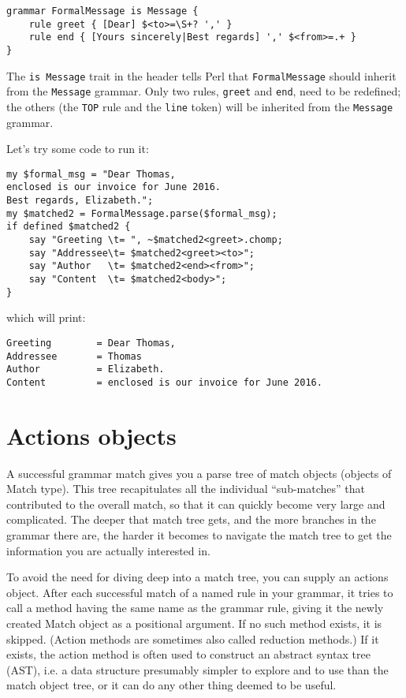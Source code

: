 \begin{verbatim}
grammar FormalMessage is Message {
    rule greet { [Dear] $<to>=\S+? ',' }
    rule end { [Yours sincerely|Best regards] ',' $<from>=.+ }
}
\end{verbatim}

The {\tt is Message} trait in the header tells Perl that 
{\tt FormalMessage} should inherit from the {\tt Message} grammar. 
Only two rules, {\tt greet} and {\tt end}, need to be 
redefined; the others (the {\tt TOP} rule 
and the {\tt line} token) will be inherited from the 
{\tt Message} grammar.

Let's try some code to run it:

\begin{verbatim}
my $formal_msg = "Dear Thomas,
enclosed is our invoice for June 2016.
Best regards, Elizabeth.";
my $matched2 = FormalMessage.parse($formal_msg);
if defined $matched2 { 
    say "Greeting \t= ", ~$matched2<greet>.chomp;
    say "Addressee\t= $matched2<greet><to>";
    say "Author   \t= $matched2<end><from>";
    say "Content  \t= $matched2<body>";
}
\end{verbatim}

which will print:

\begin{verbatim}
Greeting        = Dear Thomas,
Addressee       = Thomas
Author          = Elizabeth.
Content         = enclosed is our invoice for June 2016.
\end{verbatim}

\section{Actions objects}

\label{actions_object}

A successful grammar match gives you a parse tree of 
match objects (objects of Match type). This tree 
recapitulates all the individual 
``sub-matches'' that contributed to the overall match, so 
that it can quickly become very large and complicated. 
The deeper that match tree gets, and the more branches in 
the grammar there are, the harder it becomes to navigate the 
match tree to get the information you are actually 
interested in.

To avoid the need for diving deep into a match tree, you 
can supply an actions object. After each successful match 
of a named rule in your grammar, it tries to call a method 
having the same name as the grammar rule, giving it the 
newly created Match object as a positional argument. 
If no such method exists, it is skipped. (Action methods 
are sometimes also called reduction methods.) If it exists, 
the action method is often used to construct an abstract 
syntax tree (AST), i.e. a data structure presumably 
simpler to explore and to use than the match object tree, 
or it can do any other thing deemed to be useful.

